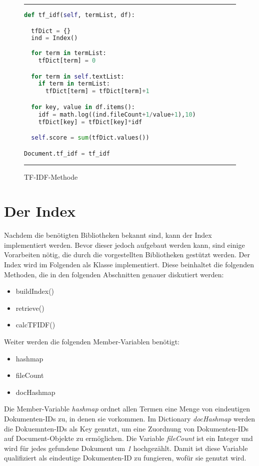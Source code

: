 \begin{figure}[h]
	\rule{\textwidth}{0.4pt}
		\begin{lstlisting}[language=Python]
def tf_idf(self, termList, df):

  tfDict = {}
  ind = Index()
  
  for term in termList:
    tfDict[term] = 0  

  for term in self.textList:
    if term in termList:
      tfDict[term] = tfDict[term]+1

  for key, value in df.items():
    idf = math.log((ind.fileCount+1/value+1),10)
    tfDict[key] = tfDict[key]*idf

  self.score = sum(tfDict.values())

Document.tf_idf = tf_idf
		\end{lstlisting}
	\rule{\textwidth}{0.4pt}
	\caption{TF-IDF-Methode}
	\label{fig:tfidf}
\end{figure}

\section{Der Index}\label{der-index}

Nachdem die benötigten Bibliotheken bekannt sind, kann der Index implementiert werden. Bevor dieser jedoch aufgebaut werden kann, sind einige Vorarbeiten nötig, die durch die vorgestellten Bibliotheken gestützt werden. Der Index wird im Folgenden als Klasse implementiert. Diese beinhaltet die folgenden Methoden, die in den folgenden Abschnitten genauer diskutiert werden:

\begin{itemize}
	\item buildIndex()
	\item retrieve()
	\item calcTFIDF()
\end{itemize}

Weiter werden die folgenden Member-Variablen benötigt:

\begin{itemize}
	\item hashmap
	\item fileCount
	\item docHashmap
\end{itemize}

Die Member-Variable \emph{hashmap} ordnet allen Termen eine Menge von eindeutigen Dokumenten-IDs zu, in denen sie vorkommen. Im Dictionary \emph{docHashmap} werden die Dokuemnten-IDs als Key genutzt, um eine Zuordnung von Dokumenten-IDs auf Document-Objekte zu ermöglichen. Die Variable \emph{fileCount} ist ein Integer und wird für jedes gefundene Dokument um \emph{1} hochgezählt. Damit ist diese Variable qualifiziert als eindeutige Dokumenten-ID zu fungieren, wofür sie genutzt wird.

